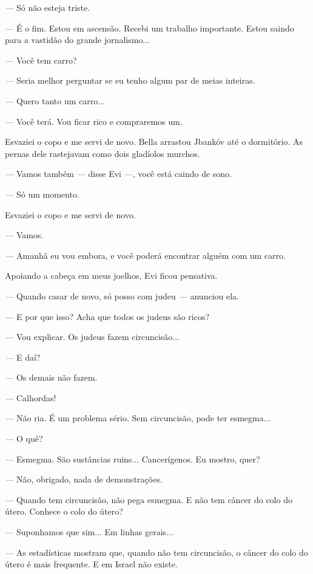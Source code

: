 \emph{---} Só não esteja triste.

\emph{---} É o fim. Estou em ascensão. Recebi um trabalho importante.
Estou saindo para a vastidão do grande jornalismo...

\emph{---} Você tem carro?

\emph{---} Seria melhor perguntar se eu tenho algum par de meias
inteiras.

\emph{---} Quero tanto um carro...

\emph{---} Você terá. Vou ficar rico e compraremos um.

Esvaziei o copo e me servi de novo. Bella arrastou Jbankóv até o
dormitório. As pernas dele rastejavam como dois gladíolos murchos.

\emph{---} Vamos também \emph{---} disse Evi \emph{---}, você está
caindo de sono.

\emph{---} Só um momento.

Esvaziei o copo e me servi de novo.

\emph{---} Vamos.

\emph{---} Amanhã eu vou embora, e você poderá encontrar alguém com um
carro.

Apoiando a cabeça em meus joelhos, Evi ficou pensativa.

\emph{---} Quando casar de novo, só posso com judeu \emph{---} anunciou
ela.

\emph{---} E por que isso? Acha que todos os judeus são ricos?

\emph{---} Vou explicar. Os judeus fazem circuncisão...

\emph{---} E daí?

\emph{---} Os demais não fazem.

\emph{---} Calhordas!

\emph{---} Não ria. É um problema sério. Sem circuncisão, pode ter
esmegma...

\emph{---} O quê?

\emph{---} Esmegma. São sustâncias ruins... Cancerígenos. Eu mostro,
quer?

\emph{---} Não, obrigado, nada de demonstrações.

\emph{---} Quando tem circuncisão, não pega esmegma. E não tem câncer do
colo do útero. Conhece o colo do útero?

\emph{---} Suponhamos que sim... Em linhas gerais...

\emph{---} As estadísticas mostram que, quando não tem circuncisão, o
câncer do colo do útero é mais frequente. E em Israel não existe.

